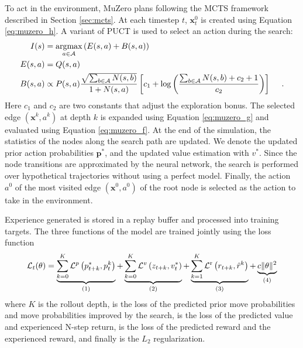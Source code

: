 To act in the environment, MuZero plans following the MCTS framework described in Section \ref{sec:mcts}.
At each timestep $t$, $\mathbf{x}^0_t$ is created using Equation \ref{eq:muzero_h}.
A variant of PUCT is used to select an action during the search:
\begin{align*}
    I(s)     & = \operatorname*{argmax}_{a \in \mathcal{A}} \left( E(s, a) + B(s, a) \right)  \\
    E(s, a)  & = Q(s, a)  \\
    B(s, a)  & \propto P(s, a) \frac{\sqrt{\sum_{b \in \mathcal{A}}N(s, b)}}{1+N(s, a)}\left[c_{1}+\log \left(\frac{\sum_{b \in \mathcal{A}}N(s, b)+c_{2}+1}{c_{2}}\right)\right] ~~~~.
\end{align*}
Here $c_1$ and $c_2$ are two constants that adjust the exploration bonus.
The selected edge $(\mathbf{x}^k, a^k)$ at depth $k$ is expanded using Equation \ref{eq:muzero_g} and evaluated using Equation \ref{eq:muzero_f}.
At the end of the simulation, the statistics of the nodes along the search path are updated.
We denote the updated prior action probabilities $\mathbf{p}^*$, and the updated value estimation with $v^*$.
Since the node transitions are approximated by the neural network, the search is performed over hypothetical trajectories without using a perfect model.
Finally, the action $a^0$ of the most visited edge $(\mathbf{x}^0, a^0)$ of the root node is selected as the action to take in the environment.

Experience generated is stored in a replay buffer and processed into training targets.
The three functions of the model are trained jointly using the loss function
\begin{equation}
    \mathcal{L}_{t}(\theta) =
    \underbrace{\sum_{k=0}^{K} \mathcal{L}^{p}\left(p^*_{t+k}, p_{t}^{k}\right)}_{(1)}
    +
    \underbrace{\sum_{k=0}^{K} \mathcal{L}^{v}\left(z_{t+k}, v^*_{t}\right)}_{(2)}
    +
    \underbrace{\sum_{k=1}^{K} \mathcal{L}^{\mathrm{r}}\left(r_{t+k}, \hat{r}^{k}\right)}_{(3)}
    +
    \underbrace{c\|\theta\|^{2}}_{(4)}
\end{equation}
where $K$ is the rollout depth,  is the loss of the predicted prior move probabilities and move probabilities improved by the search,  is the loss of the predicted value and experienced N-step return,
 is the loss of the predicted reward and the experienced reward, and finally  is the $L_2$ regularization.

